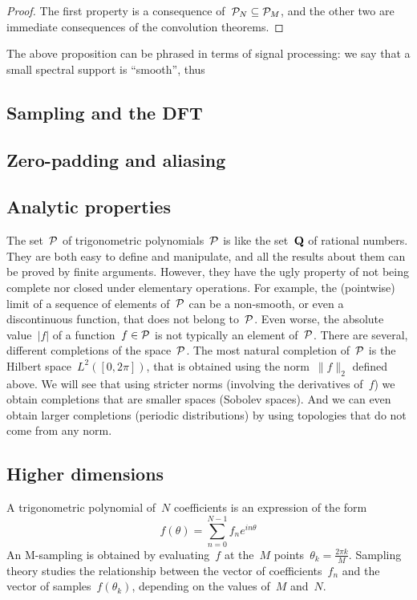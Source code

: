 \begin{proof}
The first property is a consequence of~$\mathcal{P}_N\subseteq\mathcal{P}_M$, and the other
two are immediate consequences of the convolution theorems.
\end{proof}

The above proposition can be phrased in terms of signal processing:
we say that a small spectral support is ``smooth'', thus 


\subsection{Sampling and the DFT}


\subsection{Zero-padding and aliasing}


\subsection{Analytic properties}

The set~$\mathcal{P}$ of trigonometric polynomials~$\mathcal{P}$ is like the set~$\mathbf{Q}$ of rational
numbers. They are both easy to define and manipulate, and all the results about
them can be proved by finite arguments.  However, they have the ugly property
of not being complete nor closed under elementary operations.  For example, the
(pointwise) limit of a sequence of elements of~$\mathcal{P}$ can be a non-smooth, or
even a discontinuous function, that does not belong to~$\mathcal{P}$.  Even worse, the
absolute value~$|f|$ of a function~$f\in\mathcal{P}$ is not typically an element
of~$\mathcal{P}$.  There are several, different completions of the space~$\mathcal{P}$.  The most
natural completion of~$\mathcal{P}$ is the Hilbert space~$L^2([0,2\pi])$, that is
obtained using the norm~$\|f\|_2$ defined above.  We will see that using
stricter norms (involving the derivatives of~$f$) we obtain completions that
are smaller spaces (Sobolev spaces).  And we can even obtain larger completions
(periodic distributions) by using topologies that do not come from any norm.


\subsection{Higher dimensions}

\clearpage
\thispagestyle{empty}

A trigonometric polynomial of~$N$ coefficients is an expression of the form
\[
	f(\theta)=\sum_{n=0}^{N-1} f_n e^{in\theta}
\]
An M-sampling is obtained by evaluating~$f$ at the~$M$
points~$\theta_k=\frac{2\pi k}{M}$.
Sampling theory studies the relationship between the vector of
coefficients~$f_n$ and the vector of samples~$f(\theta_k)$, depending on the
values of~$M$ and~$N$.

